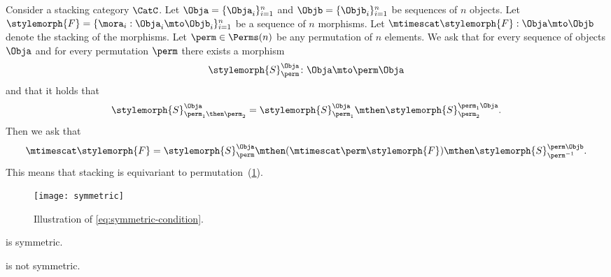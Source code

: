 \begin{ctdefinition}
    \label{def:symmetric-stacking-category}
    Consider a stacking category $\CatC$.
    Let $\Obja = \{\Obja_i\}_{i=1}^n$ and $\Objb = \{\Objb_i\}_{i=1}^n$ be sequences of $n$ objects.
    Let $\stylemorph{F} = \{\mora_i : \Obja_i \mto  \Objb_i   \}_{i=1}^n$ be a sequence of $n$ morphisms.
    Let $\mtimescat \stylemorph{F}: \Obja \mto \Objb$ denote the stacking of the morphisms.
    Let $\perm\in\Perms(n)$ be any permutation of $n$ elements.
    We ask that for every sequence of objects $\Obja$ and for every permutation $\perm$ there exists a morphism
    \begin{equation}
        \stylemorph{S}^{\Obja}_\perm \colon \Obja \mto \perm  \Obja
    \end{equation}
    and that it holds that
    \begin{equation}
        \stylemorph{S}_{\perm_1 \then \perm_2}^{\Obja}
        =
        \stylemorph{S}_{\perm_1}^{\Obja} \mthen
        \stylemorph{S}_{\perm_2}^{\perm_1 \Obja} .
    \end{equation}
    Then we ask that
    \begin{equation}
        \label{eq:symmetric-condition}
        \mtimescat \stylemorph{F}  =
        \stylemorph{S}^{\Obja}_{\perm}
        \mthen
        (\mtimescat
        \perm \stylemorph{F} )
        \mthen
        \stylemorph{S}^{\perm \Objb}_{\perm^{-1}}.
    \end{equation}
    This means that stacking is equivariant to permutation~(\cref{fig:stacking-symmetric}).
\end{ctdefinition}

\begin{figure}[h]
    \centering
    \texttt{[image: symmetric]}
    \caption{
        Illustration of \cref{eq:symmetric-condition}.
    }
    \label{fig:stacking-symmetric}
\end{figure}

\begin{example}
    \SetL is symmetric.
\end{example}

\begin{lemma}
    \Effects is not symmetric.
\end{lemma}

